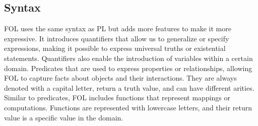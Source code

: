 \subsection{Syntax}
\label{chap:fol-syntax}
\gls{FOL} uses the same syntax as \gls{PL} but adds more features to make it more expressive. It introduces quantifiers that allow us to generalize or specify expressions, making it possible to express universal truths or existential statements. Quantifiers also enable the introduction of variables within a certain domain. Predicates that are used to express properties or relationships, allowing \gls{FOL} to capture facts about objects and their interactions. They are always denoted with a capital letter, return a truth value, and can have different arities. Similar to predicates, \gls{FOL} includes functions that represent mappings or computations. Functions are represented with lowercase letters, and their return value is a specific value in the domain.

\begin{table}[h!]
    \centering
    \caption{Examples of variables, constants, predicates, and functions in \gls{FOL}}
    \label{tab:pred_var_const_fun}
\end{table}

\begin{table}[h!]
    \centering
    \caption{Quantifiers in \gls{FOL}}
    \label{tab:quant}
\end{table}

